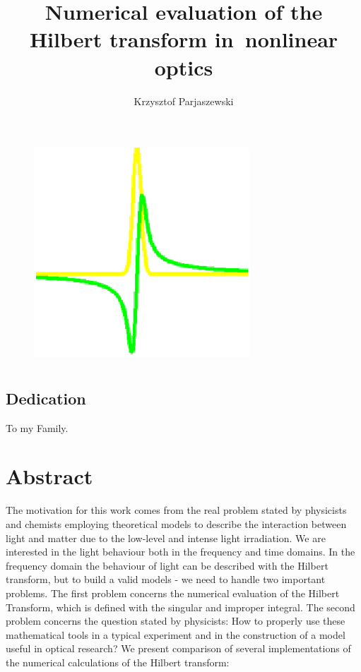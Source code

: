 \documentclass[12pt,twoside,a4paper]{article}
\title{Numerical evaluation of the Hilbert transform in~nonlinear optics}
\author{Krzysztof Parjaszewski}
\date{}
\numberwithin{equation}{subsection}
\numberwithin{figure}{subsection}
\begin{document}

\maketitle


\begin{figure}[h]
  \begin{center}
    \includegraphics{img/title.png}
  \end{center}
\end{figure}


\section*{} \label{chap:preamble} 
\subsection*{Dedication} \label{chap:pre_dedication}


To my Family.


\section*{Abstract} \label{chap:abstract}

The motivation for this work comes from the real problem stated by physicists and chemists employing theoretical models to
describe the interaction between light and matter due to the low-level and intense light irradiation. We are interested in the light
behaviour both in the frequency and time domains. In the frequency domain the behaviour of light can be described with the Hilbert
transform, but to build a valid models - we need to handle two important problems. The first problem concerns the numerical evaluation
of the Hilbert Transform, which is defined with the singular and improper integral. The second problem concerns the question stated by
physicists: How to properly use these mathematical tools in a typical experiment and in the construction of a model useful in optical
research? We present comparison of several implementations of the numerical calculations of the Hilbert transform:
\end{document}
